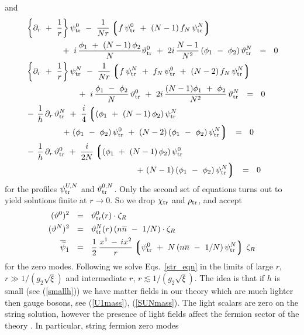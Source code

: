 \documentclass[12pt]{article}
\newcommand{\p}{\partial}
\newcommand{\wt}{\widetilde}
\newcommand{\ov}{\overline}
\newcommand{\lgr}{\left\lgroup}
\newcommand{\rgr}{\right\rgroup}
\newcommand{\zr}{\zeta_R}
\newcommand{\nbar}{\ov{n}}
\newcommand{\pts}{\psi_{\rm tr}^0}
\newcommand{\ptN}{\psi_{\rm tr}^N}
\newcommand{\tts}{\vartheta_{\rm tr}^0}
\newcommand{\ttN}{\vartheta_{\rm tr}^N}
\begin{document}
	and 
\begin{align}
\label{str_eqn}
%
\notag
	&
	\left\{ \p_r ~+~ \frac{1}{r} \right\} \pts ~-~ \frac{1}{Nr}\lgr f\,\pts ~+~ (N-1)\, f_N\, \ptN \rgr \\
\notag
	&
	\qquad\qquad
		~+~ i\, \frac{ \phi_1 ~+~ (N-1)\,\phi_2}{N} \tts 
		~+~ 2i\, \frac{N-1}{N^2}\, (\phi_1 ~-~ \phi_2)\, \ttN ~~=~~ 0
\\
%
\notag
	&
	\left\{ \p_r ~+~ \frac{1}{r} \right\} \ptN ~-~ \frac{1}{Nr} \lgr f\, \ptN ~+~ f_N\, \pts ~+~ (N-2)\,f_N\,\ptN \rgr \\
	& 
	\qquad\qquad\qquad
		~+~ i\, \frac{\phi_1 ~-~ \phi_2}{N}\, \tts 
		~+~ 2i\, \frac{(N-1)\phi_1 ~+~ \phi_2}{N^2}\, \ttN ~~=~~ 0
\\
%
\notag
	&
	-\,\frac{1}{h}\, \p_r\, \ttN 
		~+~ \frac{i}{4} \lgr (\phi_1 ~+~ (N-1)\,\phi_2)\,\ptN \right. \\
\notag
	&
	\qquad\qquad
		\left.
		~+~ (\phi_1~-~\phi_2)\,\pts ~+~ (N-2)\,(\phi_1~-~\phi_2)\,\ptN \rgr ~~=~~ 0
\\
%
\notag
	&
	-\,\frac{1}{h}\, \p_r\, \tts 
		~+~ \frac{i}{2N} \lgr (\phi_1 ~+~ (N-1)\,\phi_2)\,\pts \right. \\
\notag
	&
	\qquad\qquad\qquad\qquad\qquad\qquad\quad
		\left.
		~+~ (N-1)\,(\phi_1~-~\phi_2)\,\ptN \rgr ~~=~~0
\end{align}
	for the profiles $ \psi_{\rm tr}^{U,N} $ and $ \vartheta_{\rm tr}^{0,N} $.
	Only the second set of equations turns out to yield solutions finite at $ r \to 0 $.
	So we drop $ \chi_{\rm tr} $ and $ \rho_{\rm tr} $, and accept
\begin{align}
%
\notag
	(\vartheta^0)^2 & ~~=~~ \tts(r) \cdot \zr 
\\
%
\label{tr_anz}
	(\vartheta^N)^2 & ~~=~~ \ttN(r)\, (n\nbar ~-~ 1/N) \cdot \zr
\\
%
\notag
	\ov{\wt{\psi}}{}_{\dot 1} & ~~=~~ \frac{1}{2}\, \frac{x^1 \,-\, ix^2}{r} 
						\lgr \pts ~+~ N\,(n\nbar ~-~ 1/N)\, \ptN \rgr \, \zr
\end{align}
	for the zero modes.
	Following \cite{GSYmmodel,BSYhet} we solve Eqs.~\eqref{str_eqn} in the limits of large $r$,
	$ r \gg 1/(g_2\sqrt{\xi}) $ and intermediate $r$, $ r \lesssim 1/(g_2\sqrt{\xi}) $.
 The idea is that if $h$ is small (see (\ref{smallh})) we have  matter fields in our theory
which are much lighter then  gauge bosons, see
(\ref{U1mass}), (\ref{SUNmass}). The light scalars are zero on the string solution, however
the presence of light fields affect the fermion sector of the theory \cite{SYnone,SYhet}.
In particular,  string fermion zero modes 
\end{document}
